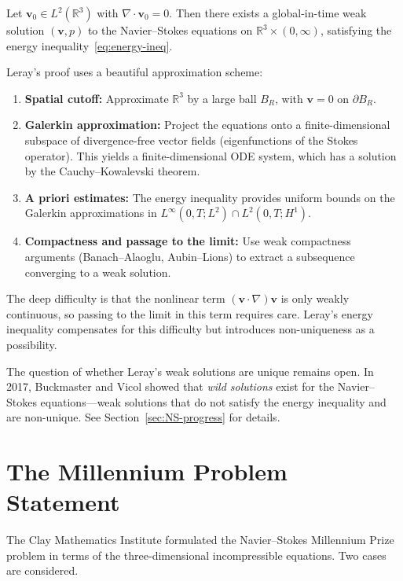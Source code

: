 \begin{theorem}[Leray, 1934]
\label{thm:leray}
Let $\mathbf{v}_0 \in L^2(\mathbb{R}^3)$ with $\nabla \cdot \mathbf{v}_0 = 0$. Then there exists a global-in-time weak solution $(\mathbf{v}, p)$ to the Navier--Stokes equations on $\mathbb{R}^3 \times (0, \infty)$, satisfying the energy inequality~\eqref{eq:energy-ineq}.
\end{theorem}

Leray's proof uses a beautiful approximation scheme:
\begin{enumerate}
\item \textbf{Spatial cutoff:} Approximate $\mathbb{R}^3$ by a large ball $B_R$, with $\mathbf{v} = 0$ on $\partial B_R$.
\item \textbf{Galerkin approximation:} Project the equations onto a finite-dimensional subspace of divergence-free vector fields (eigenfunctions of the Stokes operator). This yields a finite-dimensional ODE system, which has a solution by the Cauchy--Kowalevski theorem.
\item \textbf{A priori estimates:} The energy inequality provides uniform bounds on the Galerkin approximations in $L^\infty(0, T; L^2) \cap L^2(0, T; H^1)$.
\item \textbf{Compactness and passage to the limit:} Use weak compactness arguments (Banach--Alaoglu, Aubin--Lions) to extract a subsequence converging to a weak solution.
\end{enumerate}

The deep difficulty is that the nonlinear term $(\mathbf{v} \cdot \nabla)\mathbf{v}$ is only weakly continuous, so passing to the limit in this term requires care. Leray's energy inequality compensates for this difficulty but introduces non-uniqueness as a possibility.

\begin{remark}
The question of whether Leray's weak solutions are unique remains open. In 2017, Buckmaster and Vicol showed that \emph{wild solutions} exist for the Navier--Stokes equations---weak solutions that do not satisfy the energy inequality and are non-unique. See Section~\ref{sec:NS-progress} for details.
\end{remark}

\section{The Millennium Problem Statement}
\label{sec:NS-millennium}

The Clay Mathematics Institute formulated the Navier--Stokes Millennium Prize problem in terms of the three-dimensional incompressible equations. Two cases are considered.

